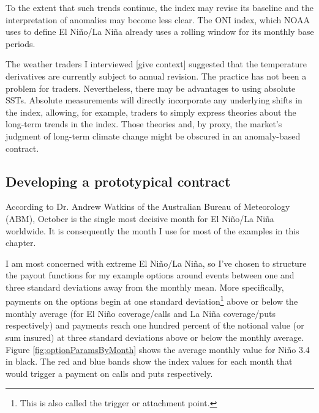 \documentclass[authoryear]{article}
\begin{document}
To the extent that such trends continue, the index may revise its baseline and the interpretation of anomalies may become less clear. The ONI index, which NOAA uses to define El Ni\~no/La Ni\~na already uses a rolling window for its monthly base periods.

The weather traders I interviewed [give context] suggested that the temperature derivatives are currently subject to annual revision. The practice has not been a problem for traders. Nevertheless, there may be advantages to using absolute SSTs. Absolute measurements will directly incorporate any underlying shifts in the index, allowing, for example, traders to simply express theories about the long-term trends in the index. Those theories and, by proxy, the market's judgment of long-term climate change might be obscured in an anomaly-based contract.

\subsection{Developing a prototypical contract}
According to Dr. Andrew Watkins of the Australian Bureau of Meteorology (ABM), October is the single most decisive month for El Ni\~no/La Ni\~na worldwide. It is consequently the month I use for most of the examples in this chapter.


I am most concerned with extreme El Ni\~no/La Ni\~na, so I've chosen to structure the payout functions for my example options around events between one and three standard deviations away from the monthly mean. More specifically, payments on the options begin at one standard deviation\footnote{This is also called the trigger or attachment point.} above or below the monthly average (for El Ni\~no coverage/calls and La Ni\~na coverage/puts respectively) and payments reach one hundred percent of the notional value (or sum insured) at three standard deviations above or below the monthly average. Figure \ref{fig:optionParamsByMonth} shows the average monthly value for Ni\~no 3.4 in black. The red and blue bands show the index values for each month that would trigger a payment on calls and puts respectively. 
\end{document}
